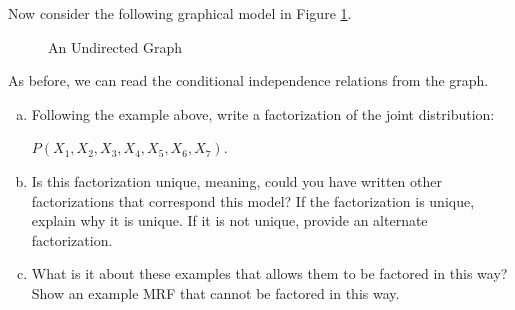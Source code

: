 \documentclass[11pt]{article}
\newcommand{\ztnodesize}{.6}
\begin{document}
Now consider the following graphical model in Figure \ref{fig:utm}.
\begin{figure}[h!]
	\begin{center}
		\caption{An Undirected Graph}
			\label{fig:utm}
		\end{center}
\end{figure}

As before, we can read the conditional independence relations from the graph. 
\begin{enumerate}[(a)]
\item Following the example above, write a factorization of the joint distribution:

\begin{center}
$P(X_1,X_2,X_3,X_4,X_5,X_6,X_7)$.
\end{center}

\item Is this factorization unique, meaning, could you have written other factorizations that correspond this model? If the factorization is unique, explain why it is unique. If it is not unique, provide an alternate factorization.
\item What is it about these examples that allows them to be factored in this way? Show an example MRF that cannot be factored in this way.
\end{enumerate}
	
\end{document}
